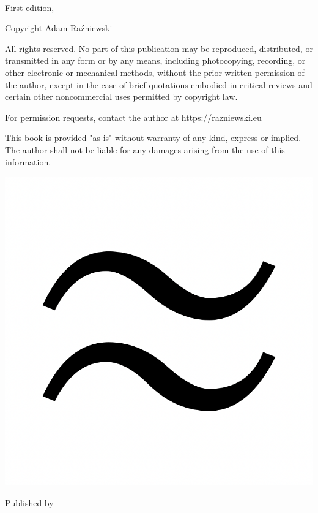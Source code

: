 
{\small
\setlength{\parindent}{0em}\setlength{\parskip}{1em}
~
\vfill

First edition, \editionyear{}

Copyright \textcopyright{} \editionyear{} Adam Raźniewski

All rights reserved. No part of this publication may be reproduced, 
distributed, or transmitted in any form or by any means, including 
photocopying, recording, or other electronic or mechanical methods, 
without the prior written permission of the author, except in the case 
of brief quotations embodied in critical reviews and certain other 
noncommercial uses permitted by copyright law.

For permission requests, contact the author at https://razniewski.eu

This book is provided "as is" without warranty of any kind, express or 
implied. The author shall not be liable for any damages arising from 
the use of this information.

\ifx\isbn\undefined\else\if\relax\detokenize\expandafter{\isbn}\relax{}\fi\fi

\includegraphics[width=0.07\linewidth]{frontmatter/logo-black.png}

Published by \publisher{}
}